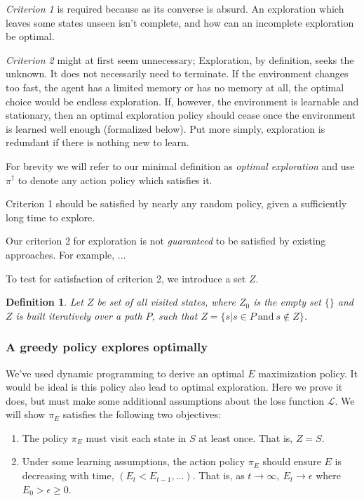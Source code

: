 \documentclass[9pt,twocolumn,twoside]{pnas-new}
\newtheorem{definition}{Definition}
\begin{document}
\textit{Criterion 1} is required because as its converse is absurd. An exploration which leaves some states unseen isn't complete, and how can an incomplete exploration be optimal.

\textit{Criterion 2} might at first seem unnecessary; Exploration, by definition, seeks the unknown. It does not necessarily need to terminate. If the environment changes too fast, the agent has a limited memory or has no memory at all, the optimal choice would be endless exploration. If, however, the environment is learnable and stationary, then an optimal exploration policy should cease once the environment is learned well enough (formalized below). Put more simply, exploration is redundant if there is nothing new to learn.

For brevity we will refer to our minimal definition as \textit{optimal exploration} and use $\pi^{\dagger}$ to denote any action policy which satisfies it.

Criterion 1 should be satisfied by nearly any random policy, given a sufficiently long time to explore.

Our criterion 2 for exploration is not \textit{guaranteed} to be satisfied by existing approaches.  For example, ... %

To test for satisfaction of criterion 2, we introduce a set $Z$. 

\begin{definition}
    Let $Z$ be set of all visited states, where $Z_0$ is the empty set $\{\}$ and $Z$ is built iteratively over a path $P$, such that $Z = \{s | s \in P\ \text{and}\ s \not\in Z\}$.    
\end{definition}


\subsubsection*{A greedy policy explores optimally}
We've used dynamic programming to derive an optimal $E$ maximization policy. It would be ideal is this policy also lead to optimal exploration. Here we prove it does, but must make some additional assumptions about the loss function $\mathcal{L}$. We will show $\pi_E$ satisfies the following two objectives:

\begin{enumerate}[noitemsep,wide=0pt,leftmargin=\dimexpr\labelwidth+2\labelsep\relax]
    \item The policy $\pi_E$ must visit each state in $S$ at least once. That is, $Z = S$.
    \item Under some learning assumptions, the action policy $\pi_E$ should ensure $E$ is decreasing with time, $(E_t < E_{t-1}, ...)$. That is, as $t \rightarrow \infty,\ E_t \rightarrow \epsilon$ where $E_0 > \epsilon \geq 0$.
\end{enumerate}
\end{document}
